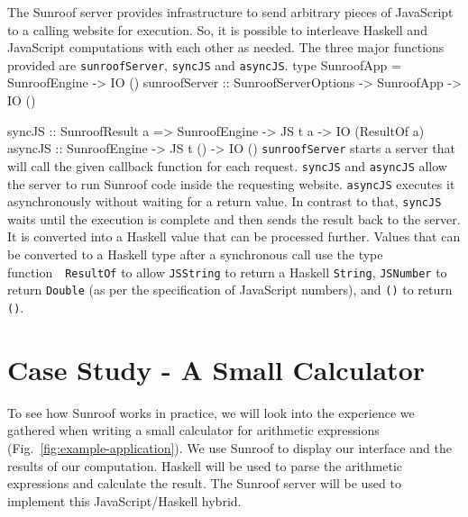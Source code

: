 \documentclass{llncs}
\newcommand{\Src}[1]{{\tt{#1}}}
\newenvironment{Code}{\verbatim}{\endverbatim}
\newcommand{\FigRef}[1]{Fig.~\ref{#1}}
\begin{document}
The Sunroof server provides infrastructure to send arbitrary pieces 
of JavaScript to a calling website for execution. 
So, it is possible to interleave Haskell and JavaScript 
computations with each other as needed. The three major functions
provided are \Src{sunroofServer}, \Src{syncJS} and \Src{asyncJS}.
\begin{Code}
type SunroofApp = SunroofEngine -> IO ()
sunroofServer :: SunroofServerOptions -> SunroofApp -> IO ()

syncJS  :: SunroofResult a 
        => SunroofEngine -> JS t a -> IO (ResultOf a)
asyncJS :: SunroofEngine -> JS t () -> IO ()
\end{Code}
\Src{sunroofServer} starts a server that will call the given callback function
for each request.
\Src{syncJS} and \Src{asyncJS} allow the server
to run Sunroof code inside the requesting website.
\Src{asyncJS} executes it asynchronously without 
waiting for a return value. In contrast to that, 
\Src{syncJS} waits until the execution is complete and
then sends the result back to the server. It
is converted into a Haskell value that can be processed further. 
Values that can be converted to a Haskell type after a synchronous
call use the type function~\cite{..}~\Src{ResultOf} to
allow \Src{JSString} to return a Haskell \Src{String}, 
\Src{JSNumber} to return \Src{Double} (as per the specification
of JavaScript numbers), and \Src{()} to return \Src{()}.

\section{Case Study - A Small Calculator}
\label{sec:extended-example}

To see how Sunroof works in practice, we will look into the 
experience we gathered when writing a small calculator
for arithmetic expressions (\FigRef{fig:example-application}). 
We use Sunroof to display our interface
and the results of our computation. Haskell will be used to parse the 
arithmetic expressions and calculate the result. The Sunroof server 
will be used to implement this JavaScript/Haskell hybrid.
\end{document}
